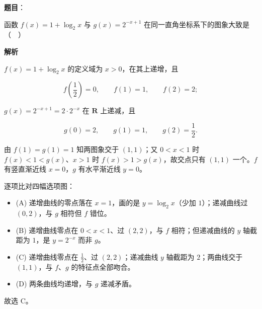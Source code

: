 \begin{answer}

\textbf{题目}：

函数 $f(x)=1+\log_2 x$ 与 $g(x)=2^{-x+1}$ 在同一直角坐标系下的图象大致是（　）
\nopagebreak[4]
\begin{center}\end{center}
\nopagebreak[4]
\textbf{解析}

$f(x)=1+\log_2x$ 的定义域为 $x>0$，在其上递增，且

\nopagebreak[4]
\[f\left(\frac12\right)=0,\qquad f(1)=1,\qquad f(2)=2;\]

$g(x)=2^{-x+1}=2\cdot2^{-x}$ 在 $\mathbf R$ 上递减，且

\nopagebreak[4]
\[g(0)=2,\qquad g(1)=1,\qquad g(2)=\frac12 .\]

由 $f(1)=g(1)=1$ 知两图象交于 $(1,1)$；又 $0<x<1$ 时 $f(x)<1<g(x)$、$x>1$ 时 $f(x)>1>g(x)$，故交点只有 $(1,1)$ 一个。$f$ 有竖直渐近线 $x=0$，$g$ 有水平渐近线 $y=0$。

逐项比对四幅选项图：

\begin{itemize}
\item (A) 递增曲线的零点落在 $x=1$，画的是 $y=\log_2x$（少加 $1$）；递减曲线过 $(0,2)$，与 $g$ 相符但 $f$ 错位。
\item (B) 递增曲线零点在 $0<x<1$、过 $(2,2)$，与 $f$ 相符；但递减曲线的 $y$ 轴截距为 $1$，是 $y=2^{-x}$ 而非 $g$。
\item (C) 递增曲线零点在 $\frac12$、过 $(2,2)$；递减曲线 $y$ 轴截距为 $2$；两曲线交于 $(1,1)$，与 $f$、$g$ 的特征点全部吻合。
\item (D) 两条曲线均递增，与 $g$ 递减矛盾。
\end{itemize}

故选 C。


\end{answer}
